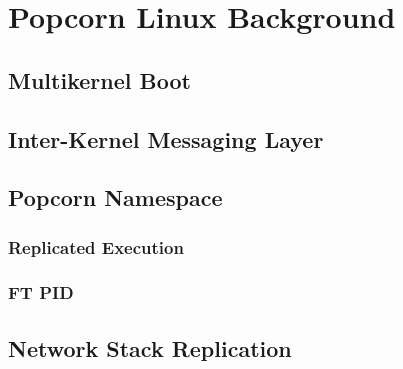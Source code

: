 \chapter{Popcorn Linux Background}
\section{Multikernel Boot}
\section{Inter-Kernel Messaging Layer}
\section{Popcorn Namespace}
\subsection{Replicated Execution}
\subsection{FT PID}
\section{Network Stack Replication}
